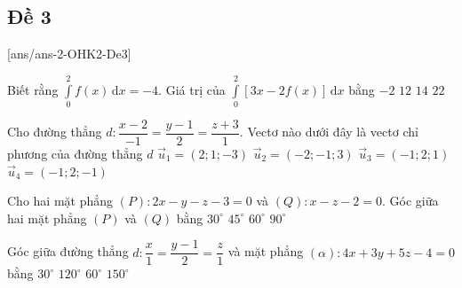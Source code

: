 \subsection{Đề 3}
[ans/ans-2-OHK2-De3]
\caulc
\begin{ex}%
	Biết rằng $\displaystyle\int\limits_{0}^{2}f(x)\mathrm{\,d}x=-4$. Giá trị của $\displaystyle\int\limits_{0}^{2}[3x-2f(x)]\mathrm{\,d}x$ bằng
	\choice
	{$-2$}
	{$12$}
	{\True $14$}
	{$22$}
\end{ex}
\begin{ex}%
	Cho đường thẳng $d\colon \dfrac{x-2}{-1}=\dfrac{y-1}{2}=\dfrac{z+3}{1}$. Vectơ nào dưới đây là vectơ chỉ phương của đường thẳng $d$
	\choice
	{$\overrightarrow{u}_1=(2 ; 1 ;-3)$}
	{$\overrightarrow{u}_2=(-2 ;-1 ; 3)$}
	{\True $\overrightarrow{u}_3=(-1 ; 2 ; 1)$}
	{$\overrightarrow{u}_4=(-1 ; 2 ;-1)$}
\end{ex}
\begin{ex}%
	Cho hai mặt phẳng $(P)\colon 2 x-y-z-3=0$ và $(Q)\colon x-z-2=0$. Góc giữa hai mặt phẳng $(P)$ và  $(Q)$ bằng
	\choice
	{$30^{\circ}$}
	{$45^{\circ}$}
	{\True $60^{\circ}$}
	{$90^{\circ}$}
\end{ex}
\begin{ex}%
	Góc giữa đường thẳng $d\colon \dfrac{x}{1}=\dfrac{y-1}{2}=\dfrac{z}{1}$ và mặt phẳng $(\alpha)\colon 4x+3y+5z-4=0$ bằng
	\choice
	{$30^{\circ}$}
	{$120^{\circ}$}
	{\True $60^{\circ}$}
	{$150^{\circ}$}
\end{ex}
